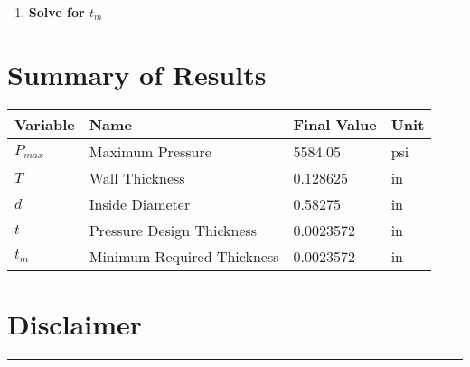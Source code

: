 \documentclass[11pt,a4paper]{article}
\begin{document}
\begin{enumerate}[label=\textbf{Step \arabic*:},leftmargin=2cm]
\item \textbf{Solve for $t_{m}$}


\end{enumerate}


\section{Summary of Results}

\begin{longtable}{llll}
\toprule
Variable & Name & Final Value & Unit \\
\midrule
\endhead
$P_{max}$ & Maximum Pressure & 5584.05 & psi \\
$T$ & Wall Thickness & 0.128625 & in \\
$d$ & Inside Diameter & 0.58275 & in \\
$t$ & Pressure Design Thickness & 0.0023572 & in \\
$t_{m}$ & Minimum Required Thickness & 0.0023572 & in \\
\bottomrule
\end{longtable}

\clearpage

\section*{Disclaimer}

\begin{center}
\rule{\textwidth}{0.4pt}
\end{center}
\end{document}
